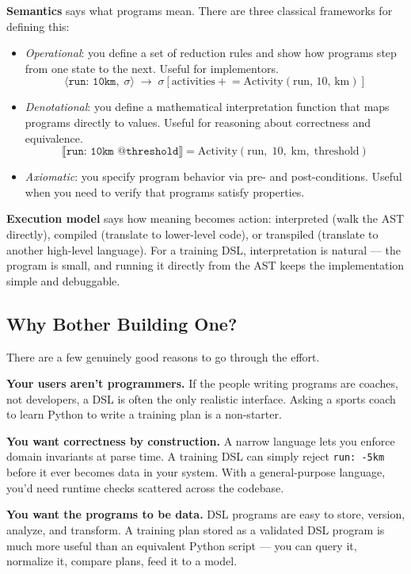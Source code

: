 \textbf{Semantics} says what programs mean. There are three classical frameworks for
defining this:
\begin{itemize}
  \item \emph{Operational}: you define a set of reduction rules and show how programs
    step from one state to the next. Useful for implementors.
    \[ \langle \texttt{run: 10km},\; \sigma \rangle \;\to\;
       \sigma[\text{activities} \mathrel{+}= \text{Activity}(\text{run},\, 10,\, \text{km})] \]
  \item \emph{Denotational}: you define a mathematical interpretation function that maps
    programs directly to values. Useful for reasoning about correctness and equivalence.
    \[ \llbracket \texttt{run: 10km @threshold} \rrbracket =
       \text{Activity}(\text{run},\; 10,\; \text{km},\; \text{threshold}) \]
  \item \emph{Axiomatic}: you specify program behavior via pre- and post-conditions.
    Useful when you need to verify that programs satisfy properties.
\end{itemize}

\textbf{Execution model} says how meaning becomes action: interpreted (walk the AST
directly), compiled (translate to lower-level code), or transpiled (translate to another
high-level language). For a training DSL, interpretation is natural --- the program is
small, and running it directly from the AST keeps the implementation simple and debuggable.

\subsection{Why Bother Building One?}

There are a few genuinely good reasons to go through the effort.

\textbf{Your users aren't programmers.} If the people writing programs are coaches, not
developers, a DSL is often the only realistic interface. Asking a sports coach to learn
Python to write a training plan is a non-starter.

\textbf{You want correctness by construction.} A narrow language lets you enforce domain
invariants at parse time. A training DSL can simply reject \texttt{run: -5km} before it
ever becomes data in your system. With a general-purpose language, you'd need runtime
checks scattered across the codebase.

\textbf{You want the programs to be data.} DSL programs are easy to store, version,
analyze, and transform. A training plan stored as a validated DSL program is much more
useful than an equivalent Python script --- you can query it, normalize it, compare plans,
feed it to a model.

